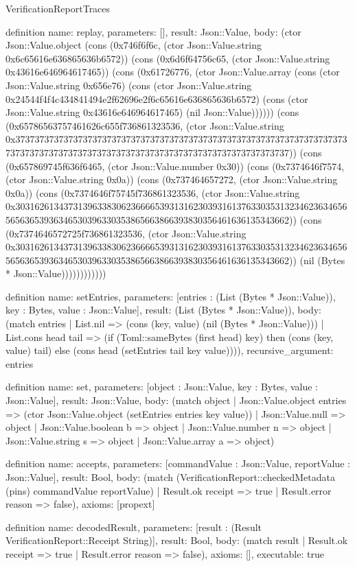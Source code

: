 \begin{lexlean}{VerificationReportTraces}
\begin{semanticmodule}
definition{
  name: replay,
  parameters: [],
  result: Json::Value,
  body: (ctor Json::Value.object (cons (0x746f6f6c, (ctor Json::Value.string 0x6c65616e636865636b6572)) (cons (0x6d6f64756c65, (ctor Json::Value.string 0x43616e646964617465)) (cons (0x61726776, (ctor Json::Value.array (cons (ctor Json::Value.string 0x656e76) (cons (ctor Json::Value.string 0x24544f4f4c434841494e2f62696e2f6c65616e636865636b6572) (cons (ctor Json::Value.string 0x43616e646964617465) (nil Json::Value)))))) (cons (0x65786563757461626c655f736861323536, (ctor Json::Value.string 0x37373737373737373737373737373737373737373737373737373737373737373737373737373737373737373737373737373737373737373737373737373737)) (cons (0x657869745f636f6465, (ctor Json::Value.number 0x30)) (cons (0x7374646f7574, (ctor Json::Value.string 0x0a)) (cons (0x737464657272, (ctor Json::Value.string 0x0a)) (cons (0x7374646f75745f736861323536, (ctor Json::Value.string 0x30316261343731396338306236666539313162303931613763303531323462363465656563653936346530396330353865663866393830356461636135343662)) (cons (0x7374646572725f736861323536, (ctor Json::Value.string 0x30316261343731396338306236666539313162303931613763303531323462363465656563653936346530396330353865663866393830356461636135343662)) (nil (Bytes * Json::Value))))))))))))
}

definition{
  name: setEntries,
  parameters: [entries : (List (Bytes * Json::Value)), key : Bytes, value : Json::Value],
  result: (List (Bytes * Json::Value)),
  body: (match entries | List.nil => (cons (key, value) (nil (Bytes * Json::Value))) | List.cons head tail => (if (Toml::sameBytes (first head) key) then (cons (key, value) tail) else (cons head (setEntries tail key value)))),
  recursive_argument: entries
}

definition{
  name: set,
  parameters: [object : Json::Value, key : Bytes, value : Json::Value],
  result: Json::Value,
  body: (match object | Json::Value.object entries => (ctor Json::Value.object (setEntries entries key value)) | Json::Value.null => object | Json::Value.boolean b => object | Json::Value.number n => object | Json::Value.string s => object | Json::Value.array a => object)
}

definition{
  name: accepts,
  parameters: [commandValue : Json::Value, reportValue : Json::Value],
  result: Bool,
  body: (match (VerificationReport::checkedMetadata (pins) commandValue reportValue) | Result.ok receipt => true | Result.error reason => false),
  axioms: [propext]
}

definition{
  name: decodedResult,
  parameters: [result : (Result VerificationReport::Receipt String)],
  result: Bool,
  body: (match result | Result.ok receipt => true | Result.error reason => false),
  axioms: [],
  executable: true
}


\end{semanticmodule}
\end{lexlean}
